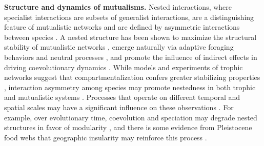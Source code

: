 \documentclass[twocolumn,preprintnumbers,amsmath,amssymb,superscriptaddress,linenumbers]{revtex4-1}
\begin{document}






\vspace{0mm}
\noindent \textbf{Structure and dynamics of mutualisms.}
Nested interactions, where specialist interactions are subsets of generalist interactions, are a distinguishing feature of mutualistic networks \cite{Bascompte2003} and are defined by asymmetric interactions between species \cite{Bascompte2003,Bascompte2006,Guimaraes2006,Araujo2010}.
A nested structure has been shown to maximize the structural stability of mutualistic networks \cite{Rohr2014}, emerge naturally via adaptive foraging behaviors \cite{Valdovinos2016,Valdovinos2019} and neutral processes \cite{Krishna2008}, and promote the influence of indirect effects in driving coevolutionary dynamics \cite{Guimaraes2017}.
While models and experiments of trophic networks suggest that compartmentalization confers greater stabilizing properties \cite{Stouffer2011,Gilarranz2017}, interaction asymmetry among species may promote nestedness in both trophic \cite{Araujo2010} and mutualistic systems \cite{Pires2011}.
Processes that operate on different temporal and spatial scales may have a significant influence on these observations \cite{Massol2011}.
For example, over evolutionary time, coevolution and speciation may degrade nested structures in favor of modularity \cite{Ponisio2019}, and there is some evidence from Pleistocene food webs that geographic insularity may reinforce this process \cite{Yeakel2013}.
\end{document}
